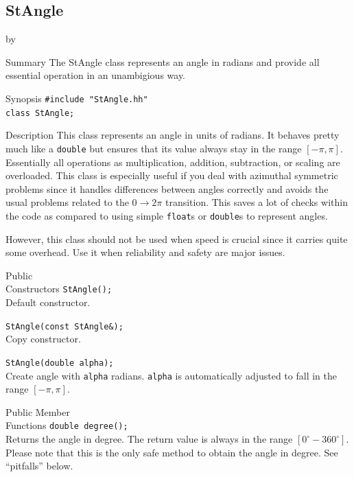 \documentclass[twoside]{article}
\newcommand{\entrylabel}[1]{\mbox{\textbf{{#1}}}\hfil}%
\newenvironment{entry}
{\begin{list}{}%
    {\renewcommand{\makelabel}{\entrylabel}%
     \setlength{\labelwidth}{90pt}%
     \setlength{\leftmargin}{\labelwidth}
     \advance\leftmargin by \labelsep%
      }%
    }%
  {\end{list}}
\newcommand{\Entrylabel}[1]%
{\raisebox{0pt}[1ex][0pt]{\makebox[\labelwidth][l]%
    {\parbox[t]{\labelwidth}{\hspace{0pt}\textbf{{#1}}}}}}
\newenvironment{Entry}%
{\renewcommand{\entrylabel}{\Entrylabel}\begin{entry}}%
  {\end{entry}}
\begin{document}
%
%
\subsection{StAngle}  \label{StAngle}
\begin{Entry}
\item[Summary]
     The StAngle class represents an angle in radians and provide
     all essential operation in an unambigious way.
     
\item[Synopsis]
  \verb+#include "StAngle.hh"+ \\
  \verb+class StAngle;+\\
    
\item[Description]   
  This class represents an angle in units of radians. It behaves
  pretty much like a \texttt{double} but ensures that its value
  always stay in the range $[-\pi, \pi]$. Essentially all operations
  as multiplication, addition, subtraction, or scaling are overloaded.
  This class is especially useful if you deal with azimuthal symmetric
  problems since it handles differences between angles correctly and avoids
  the usual problems related to the $0 \rightarrow 2 \pi$ transition.
  This saves a lot of checks within the code as compared to using
  simple \texttt{float}s or \texttt{double}s to represent angles.

  However, this class should not be used when speed is crucial since
  it carries quite some overhead. Use it when reliability and safety
  are major issues.

\item[Public\\ Constructors]
    \verb+StAngle();+\\
    Default constructor. 
    
    \verb+StAngle(const StAngle&);+\\
    Copy constructor. 
    
    \verb+StAngle(double alpha);+\\
    Create angle with \texttt{alpha} radians. \texttt{alpha} is automatically
    adjusted to fall in the range $[-\pi, \pi]$.

    
\item[Public Member\\ Functions]
    \verb+double degree();+\\
    Returns the angle in degree. The return value is always in the range
    $[0^\circ - 360^\circ]$. Please note that this is the only safe method
    to obtain the angle in degree. See ``pitfalls'' below.


\end{Entry}
\end{document}
